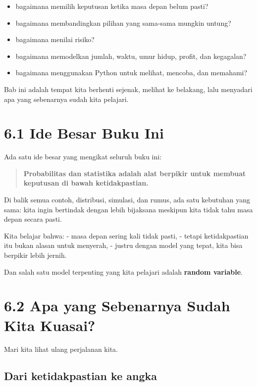 \documentclass[
  letterpaper,
  DIV=11,
  numbers=noendperiod]{scrreprt}
\providecommand{\tightlist}{%
  \setlength{\itemsep}{0pt}\setlength{\parskip}{0pt}}
\begin{document}
\begin{itemize}
\tightlist
\item
  bagaimana memilih keputusan ketika masa depan belum pasti?
\item
  bagaimana membandingkan pilihan yang sama-sama mungkin untung?
\item
  bagaimana menilai risiko?
\item
  bagaimana memodelkan jumlah, waktu, umur hidup, profit, dan kegagalan?
\item
  bagaimana menggunakan Python untuk melihat, mencoba, dan memahami?
\end{itemize}

Bab ini adalah tempat kita berhenti sejenak, melihat ke belakang, lalu
menyadari apa yang sebenarnya sudah kita pelajari.

\section{6.1 Ide Besar Buku Ini}\label{ide-besar-buku-ini}

Ada satu ide besar yang mengikat seluruh buku ini:

\begin{quote}
\textbf{Probabilitas dan statistika adalah alat berpikir untuk membuat
keputusan di bawah ketidakpastian.}
\end{quote}

Di balik semua contoh, distribusi, simulasi, dan rumus, ada satu
kebutuhan yang sama: kita ingin bertindak dengan lebih bijaksana
meskipun kita tidak tahu masa depan secara pasti.

Kita belajar bahwa: - masa depan sering kali tidak pasti, - tetapi
ketidakpastian itu bukan alasan untuk menyerah, - justru dengan model
yang tepat, kita bisa berpikir lebih jernih.

Dan salah satu model terpenting yang kita pelajari adalah \textbf{random
variable}.

\section{6.2 Apa yang Sebenarnya Sudah Kita
Kuasai?}\label{apa-yang-sebenarnya-sudah-kita-kuasai}

Mari kita lihat ulang perjalanan kita.

\subsection{Dari ketidakpastian ke
angka}\label{dari-ketidakpastian-ke-angka}
\end{document}
